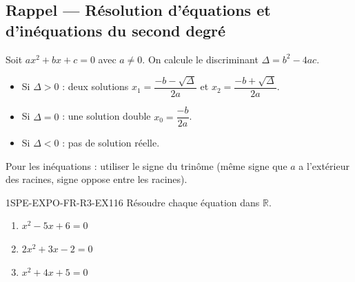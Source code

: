 

\subsection*{Rappel — Résolution d'équations et d'inéquations du second degré}

Soit $ax^2 + bx + c = 0$ avec $a
\neq 0$. On calcule le discriminant $\Delta = b^2 - 4ac$.
\begin{itemize}
  \item Si $\Delta > 0$ : deux solutions $x_1 = \dfrac{-b - \sqrt{\Delta}}{2a}$ et $x_2 = \dfrac{-b + \sqrt{\Delta}}{2a}$.
  \item Si $\Delta = 0$ : une solution double $x_0 = \dfrac{-b}{2a}$.
  \item Si $\Delta < 0$ : pas de solution réelle.
\end{itemize}

Pour les inéquations : utiliser le signe du trinôme (même signe que $a$ a l'extérieur des racines, signe oppose entre les racines).


\begin{exercice}{1SPE-EXPO-FR-R3-EX1}{1}{6}
Résoudre chaque équation dans $\mathbb{R}$.
\begin{enumerate}
  \item $x^2 - 5x + 6 = 0$
  \item $2x^2 + 3x - 2 = 0$
  \item $x^2 + 4x + 5 = 0$
\end{enumerate}
\end{exercice}


